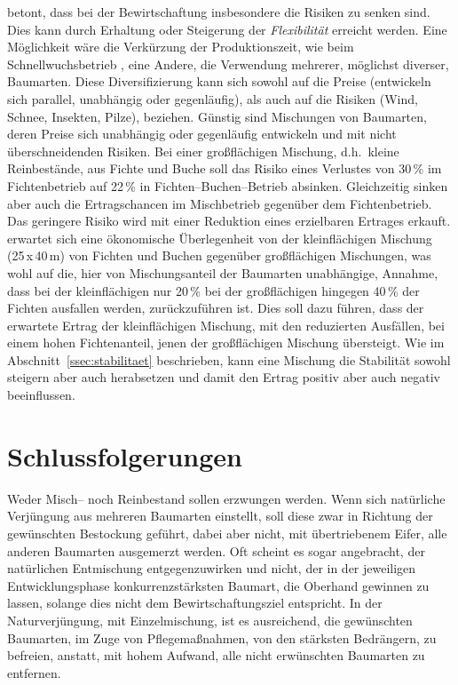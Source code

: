 \documentclass[twocolumn]{scrartcl}
\begin{document}
\cite{knoke2007mischwald} betont, dass bei der Bewirtschaftung
insbesondere die Risiken zu senken sind. Dies kann durch Erhaltung
oder Steigerung der \emph{Flexibilität} erreicht werden. Eine
Möglichkeit wäre die Verkürzung der Produktionszeit, wie beim
Schnellwuchsbetrieb
\citep{bohdanecky1890worlik,schiffel1904Wuchsgestze,schwappach1905durchforstungFichte,eulefeld1922schnellwuchs,gehrhardt1924StammzahlhaltungInJungenFichtenbestaenden},
eine Andere, die Verwendung mehrerer, möglichst diverser,
Baumarten. Diese Diversifizierung kann sich sowohl auf die Preise
(entwickeln sich parallel, unabhängig oder gegenläufig), als auch auf
die Risiken (Wind, Schnee, Insekten, Pilze), beziehen. Günstig sind
Mischungen von Baumarten, deren Preise sich unabhängig oder
gegenläufig entwickeln und mit nicht überschneidenden Risiken. Bei
einer großflächigen Mischung, d.h.\ kleine Reinbestände, aus Fichte
und Buche soll das Risiko eines Verlustes von 30\,\% im Fichtenbetrieb
auf 22\,\% in Fichten--Buchen--Betrieb absinken. Gleichzeitig sinken
aber auch die Ertragschancen im Mischbetrieb gegenüber dem
Fichtenbetrieb. Das geringere Risiko wird mit einer Reduktion eines
erzielbaren Ertrages erkauft. \cite{knoke2007mischwaldB} erwartet sich
eine ökonomische Überlegenheit von der kleinflächigen Mischung
(25\,x\,40\,m) von Fichten und Buchen gegenüber großflächigen
Mischungen, was wohl auf die, hier von Mischungsanteil der Baumarten
unabhängige, Annahme, dass bei der kleinflächigen nur 20\,\% bei der
großflächigen hingegen 40\,\% der Fichten ausfallen werden,
zurückzuführen ist. Dies soll dazu führen, dass der erwartete Ertrag
der kleinflächigen Mischung, mit den reduzierten Ausfällen, bei einem
hohen Fichtenanteil, jenen der großflächigen Mischung übersteigt. Wie
im Abschnitt~\ref{ssec:stabilitaet} beschrieben, kann eine Mischung
die Stabilität sowohl steigern aber auch herabsetzen und damit den
Ertrag positiv aber auch negativ beeinflussen.

\section{Schlussfolgerungen}
\label{sec:schlussfolgerungen}

Weder Misch-- noch Reinbestand sollen erzwungen werden. Wenn sich
natürliche Verjüngung aus mehreren Baumarten einstellt, soll diese zwar
in Richtung der gewünschten Bestockung geführt, dabei aber nicht, mit
übertriebenem Eifer, alle anderen Baumarten ausgemerzt werden. Oft
scheint es sogar angebracht, der natürlichen Entmischung
entgegenzuwirken und nicht, der in der jeweiligen Entwicklungsphase
konkurrenzstärksten Baumart, die Oberhand gewinnen zu lassen, solange
dies nicht dem Bewirtschaftungsziel entspricht. In der
Naturverjüngung, mit Einzelmischung, ist es ausreichend, die
gewünschten Baumarten, im Zuge von Pflegemaßnahmen, von den stärksten
Bedrängern, zu befreien, anstatt, mit hohem Aufwand, alle nicht
erwünschten Baumarten zu entfernen.
\end{document}
